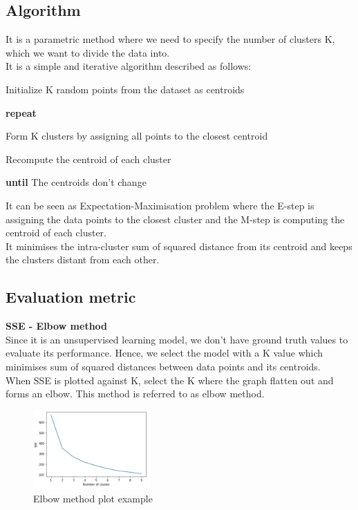 \documentclass[12pt,letterpaper, onecolumn]{exam}
\begin{document}
\subsection*{Algorithm}

It is a parametric method where we need to specify the number of clusters K, which we want to divide the data into.
\\It is a simple and iterative algorithm described as follows:
\begin{mydesc}
 \item[\hspace{2cm}]\textmd{Initialize K random points from the dataset as centroids}
  \item[\hspace{2cm}]\textmd{\textbf{repeat}}
  \item[\hspace{3cm}]\textmd{Form K clusters by assigning all points to the closest centroid}
  \item[\hspace{3cm}]\textmd{Recompute the centroid of each cluster}
  \item[\hspace{2cm}]\textmd{\textbf{until} The centroids don't change}
 \end{mydesc}

It can be seen as Expectation-Maximisation problem where the E-step is assigning the data points to the closest cluster and the M-step is computing the centroid of each cluster.\\
It minimises the intra-cluster sum of squared distance from its centroid and keeps the clusters distant from each other.

\subsection*{Evaluation metric}
\textbf{SSE - Elbow method}\\
Since it is an unsupervised learning model, we don't have ground truth values to evaluate its performance. Hence, we select the model with a K value which minimises sum of squared distances between data points and its centroids.\\
When SSE is plotted against K, select the K where the graph flatten out and forms an elbow. This method is referred to as elbow method.
\newpage
\begin{figure}[!h]
\caption{Elbow method plot example}
\centering
\includegraphics[width = 0.4\textwidth]{../images/elbowmethod.png}
\end{figure}
\end{document}
